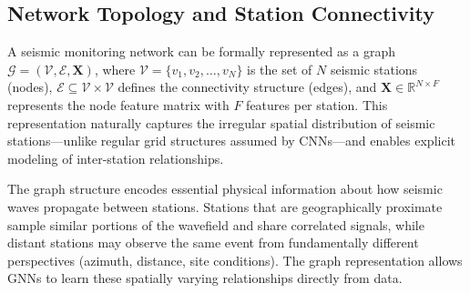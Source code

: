 \documentclass[review,authoryear]{elsarticle}
\begin{document}
\subsection{Network Topology and Station Connectivity}

A seismic monitoring network can be formally represented as a graph $\mathcal{G} = (\mathcal{V}, \mathcal{E}, \mathbf{X})$, where $\mathcal{V} = \{v_1, v_2, \ldots, v_N\}$ is the set of $N$ seismic stations (nodes), $\mathcal{E} \subseteq \mathcal{V} \times \mathcal{V}$ defines the connectivity structure (edges), and $\mathbf{X} \in \mathbb{R}^{N \times F}$ represents the node feature matrix with $F$ features per station. This representation naturally captures the irregular spatial distribution of seismic stations---unlike regular grid structures assumed by CNNs---and enables explicit modeling of inter-station relationships.

The graph structure encodes essential physical information about how seismic waves propagate between stations. Stations that are geographically proximate sample similar portions of the wavefield and share correlated signals, while distant stations may observe the same event from fundamentally different perspectives (azimuth, distance, site conditions). The graph representation allows GNNs to learn these spatially varying relationships directly from data.
\end{document}
